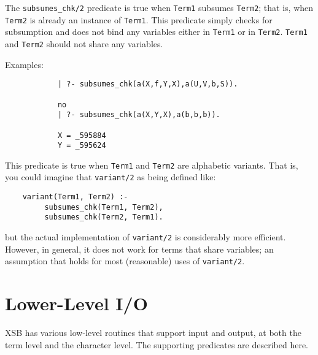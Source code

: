 \begin{description}
    The {\tt subsumes\_chk/2} predicate is true when {\tt Term1} subsumes 
    {\tt Term2}; that is, when {\tt Term2} is already an instance of
    {\tt Term1}.  This predicate simply checks for subsumption and 
    does not bind any variables either in {\tt Term1} or in {\tt Term2}.
    {\tt Term1} and {\tt Term2} should not share any variables.

    Examples:
    {\footnotesize
     \begin{verbatim}
            | ?- subsumes_chk(a(X,f,Y,X),a(U,V,b,S)).

            no
            | ?- subsumes_chk(a(X,Y,X),a(b,b,b)).

            X = _595884
            Y = _595624
     \end{verbatim}}

    This predicate is true when {\tt Term1} and {\tt Term2} are 
    alphabetic variants.  That is, you could imagine that {\tt variant/2}
    as being defined like:
    \begin{center}
    \begin{minipage}{3.5in}
    \begin{verbatim}
	variant(Term1, Term2) :-
	     subsumes_chk(Term1, Term2),
	     subsumes_chk(Term2, Term1).
    \end{verbatim}
    \end{minipage}
    \end{center}
    but the actual implementation of {\tt variant/2} is considerably more
    efficient.  However, in general, it does not work for terms that share
    variables; an assumption that holds for most (reasonable) uses of
    {\tt variant/2}.
\end{description}


\section{Lower-Level I/O}

XSB  has various low-level routines that support input and output, 
at both the term level and the character level.  The supporting
predicates are described here.


